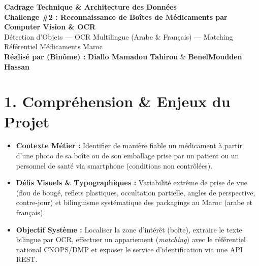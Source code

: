 \documentclass[10pt,a4paper]{article}
\begin{document}
\begin{center}
    {\color{primary}\LARGE \bfseries Cadrage Technique \& Architecture des Données}\\[4pt]
    {\color{secondary}\large \bfseries Challenge \#2 : Reconnaissance de Boîtes de Médicaments par Computer Vision \& OCR}\\[3pt]
    {\small \color{darktext} Détection d'Objets --- OCR Multilingue (Arabe \& Français) --- Matching Référentiel Médicaments Maroc}\\[4pt]
    {\small \textbf{Réalisé par (Binôme) :} \textbf{Diallo Mamadou Tahirou} \quad \& \quad \textbf{BenelMoudden Hassan}}
\end{center}

\vspace{0.15cm}

\section*{1. Compréhension \& Enjeux du Projet}
\begin{itemize}
    \item \textbf{Contexte Métier :} Identifier de manière fiable un médicament à partir d'une photo de sa boîte ou de son emballage prise par un patient ou un personnel de santé via smartphone (conditions non contrôlées).
    \item \textbf{Défis Visuels \& Typographiques :} Variabilité extrême de prise de vue (flou de bougé, reflets plastiques, occultation partielle, angles de perspective, contre-jour) et bilinguisme systématique des packagings au Maroc (arabe et français).
    \item \textbf{Objectif Système :} Localiser la zone d'intérêt (boîte), extraire le texte bilingue par OCR, effectuer un appariement (\textit{matching}) avec le référentiel national CNOPS/DMP et exposer le service d'identification via une API REST.
\end{itemize}

\vspace{0.25cm}

\end{document}
